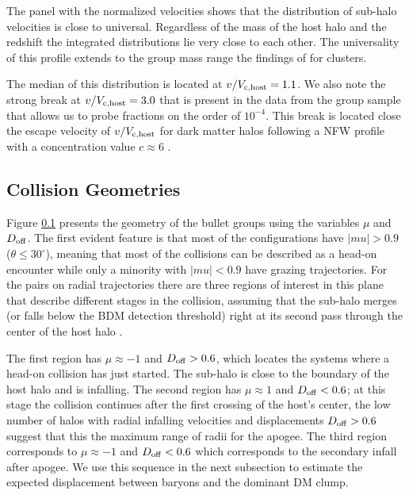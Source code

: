 \documentclass{emulateapj}
\begin{document}
The panel with the normalized velocities shows that the distribution
of sub-halo velocities is close to universal. Regardless of the mass
of the host halo and the redshift the integrated distributions lie
very close to each other.  The universality of this profile extends to
the group mass range the findings of \citep{Hayashi2006} for clusters.

The median of this distribution is located at $v/V_{\rm
  c,host}=1.1$. We also note the strong break at $v/V_{\rm
  c,host}=3.0$ that is present in the data from the group sample that
allows us to probe fractions on the order of $10^{-4}$.  This break is
located close the escape velocity of $v/V_{\rm c,host}$ for dark
matter halos following a NFW profile with a concentration value
$c\approx 6$ \citep{Hayashi2006}.  





\subsection{Collision Geometries}
\label{fig:geometry}

Figure \ref{fig:geometry} presents the geometry of the bullet groups using the 
variables $\mu$ and $D_{\rm off}$. The first evident feature is that
most of the configurations have $|mu|>0.9$ ($\theta\leq 30^{\circ}$),
meaning that most of the collisions can be described as a head-on
encounter while only a minority with $|mu|<0.9$ have grazing
trajectories. For the pairs on radial trajectories there are three
regions of interest in this plane that describe different stages in
the collision, assuming that the sub-halo merges (or falls below the
BDM detection threshold) right at its second pass through the center
of the host halo \citep{Poole2006}.  


The first region has $\mu\approx-1$ and $D_{\rm off}>0.6$, which
locates the systems where a head-on collision has just started. The
sub-halo is close to the boundary of the host halo and is
infalling. The second region has $\mu\approx 1$ and $D_{\rm off}<0.6$;
at this stage the collision continues after the first crossing of the
host's center, the low number of halos with radial infalling velocities
and displacements $D_{\rm off}>0.6$ suggest that this the maximum
range of radii for the apogee.  The third region corresponds to
$\mu\approx-1$ and $D_{\rm off}<0.6$ which corresponds to the
secondary infall after apogee. We use this sequence in the next
subsection to estimate the expected displacement between baryons and
the dominant DM clump. 
\end{document}
